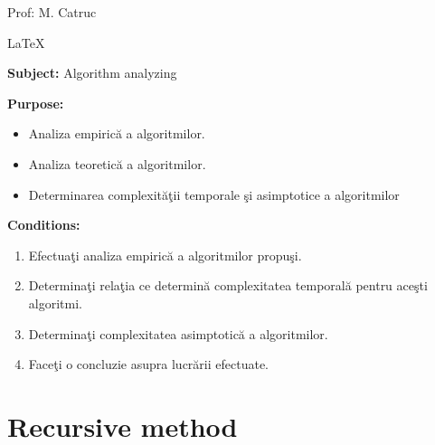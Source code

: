 \documentclass{article}
\begin{document}
	\begin{flushright}
		Prof: M. Catruc
	\end{flushright}

	\begin{center} \LaTeX \end{center}
	\pagebreak

	\begin{center}
		{\Huge \textbf{Subject:} Algorithm analyzing}
	\end{center}

	{\large \textbf{Purpose:}}
	\begin{itemize}
		\item Analiza empirică a algoritmilor.
		\item Analiza teoretică a algoritmilor.
		\item Determinarea complexităţii temporale şi asimptotice a algoritmilor
	\end{itemize}

	{\large \textbf{Conditions:}}
	\begin{enumerate}
		\item Efectuaţi analiza empirică a algoritmilor propuşi.
		\item Determinaţi relaţia ce determină complexitatea temporală pentru aceşti algoritmi.
		\item Determinaţi complexitatea asimptotică a algoritmilor.
		\item Faceţi o concluzie asupra lucrării efectuate.
	\end{enumerate}

	\newpage
	\section{Recursive method}
\end{document}
